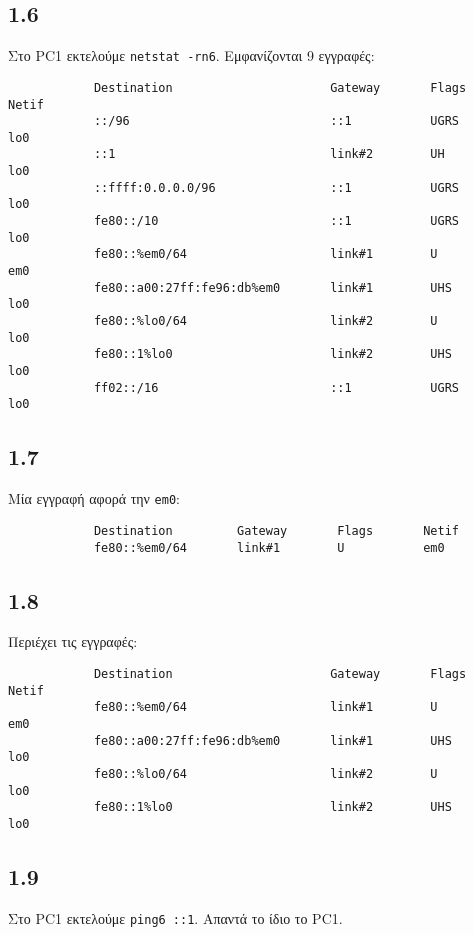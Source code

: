 \documentclass[a4paper, 12pt]{article}
\begin{document}
	\subsection*{1.6}
		Στο PC1 εκτελούμε \verb|netstat -rn6|. Εμφανίζονται 9 εγγραφές:
		
		\begin{verbatim}
			Destination                      Gateway       Flags       Netif 
			::/96                            ::1           UGRS        lo0
			::1                              link#2        UH          lo0
			::ffff:0.0.0.0/96                ::1           UGRS        lo0
			fe80::/10                        ::1           UGRS        lo0
			fe80::%em0/64                    link#1        U           em0
			fe80::a00:27ff:fe96:db%em0       link#1        UHS         lo0
			fe80::%lo0/64                    link#2        U           lo0
			fe80::1%lo0                      link#2        UHS         lo0
			ff02::/16                        ::1           UGRS        lo0
		\end{verbatim}

	\subsection*{1.7}
		Μία εγγραφή αφορά την \verb|em0|:
		
		\begin{verbatim}
			Destination         Gateway       Flags       Netif
			fe80::%em0/64       link#1        U           em0
		\end{verbatim}

	\subsection*{1.8}
		Περιέχει τις εγγραφές:
		
		\begin{verbatim}
			Destination                      Gateway       Flags       Netif
			fe80::%em0/64                    link#1        U           em0
			fe80::a00:27ff:fe96:db%em0       link#1        UHS         lo0
			fe80::%lo0/64                    link#2        U           lo0
			fe80::1%lo0                      link#2        UHS         lo0
		\end{verbatim}

	\subsection*{1.9}
		Στο PC1 εκτελούμε \verb|ping6 ::1|. Απαντά το ίδιο το PC1.
	
\end{document}
